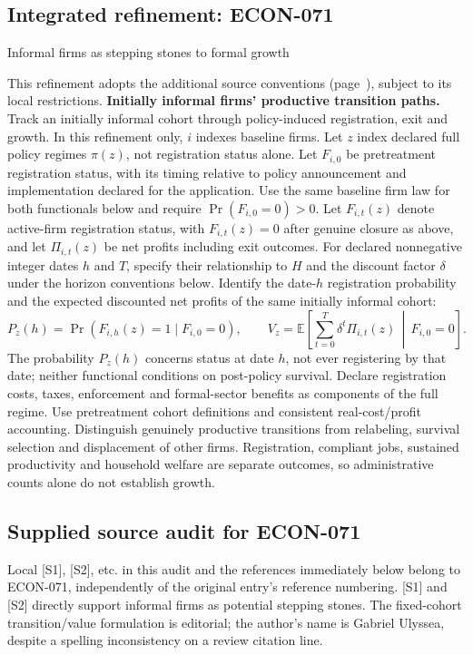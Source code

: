 \documentclass[11pt,a4paper]{article}
\begin{document}
\subsection*{Integrated refinement: ECON-071}
{\sffamily\small\color{muted}Informal firms as stepping stones to formal growth\par}
This refinement adopts the additional source conventions
(page~\pageref{audited:conventions}), subject to its local restrictions.
\textbf{Initially informal firms' productive transition paths.}
Track an initially informal cohort through policy-induced registration, exit
and growth. In this refinement only, $i$ indexes baseline firms. Let $z$
index declared full policy regimes $\pi(z)$, not registration status alone.
Let $F_{i,0}$ be pretreatment registration status, with its timing relative
to policy announcement and implementation declared for the application.
Use the same baseline firm law for both functionals below and require
$\Pr(F_{i,0}=0)>0$. Let $F_{i,t}(z)$ denote active-firm registration status,
with $F_{i,t}(z)=0$ after genuine closure as above, and let
$\Pi_{i,t}(z)$ be net profits including exit outcomes. For declared
nonnegative integer dates $h$ and $T$, specify their relationship to $H$
and the discount factor $\delta$ under the horizon conventions below.
Identify the date-$h$ registration probability and the expected discounted
net profits of the same initially informal cohort:
\[
P_z(h)=\Pr(F_{i,h}(z)=1\mid F_{i,0}=0),\qquad
V_z=\mathbb E\left[\sum_{t=0}^{T}\delta^t\Pi_{i,t}(z)\,\middle|\,F_{i,0}=0\right].
\]
The probability $P_z(h)$ concerns status at date $h$, not ever registering
by that date; neither functional conditions on post-policy survival.
Declare registration costs, taxes, enforcement and formal-sector benefits as
components of the full regime. Use pretreatment cohort definitions and
consistent real-cost/profit accounting. Distinguish genuinely productive
transitions from relabeling, survival selection and displacement of other firms.
Registration, compliant jobs, sustained productivity and household welfare are
separate outcomes, so administrative counts alone do not establish growth.
\subsection*{Supplied source audit for ECON-071}
Local [S1], [S2], etc. in this audit and the references immediately below
belong to ECON-071, independently of the original entry's reference numbering.
[S1] and [S2] directly support informal firms as potential stepping stones. The fixed-cohort transition/value formulation is editorial; the author's name is Gabriel Ulyssea, despite a spelling inconsistency on a review citation line.
\end{document}
